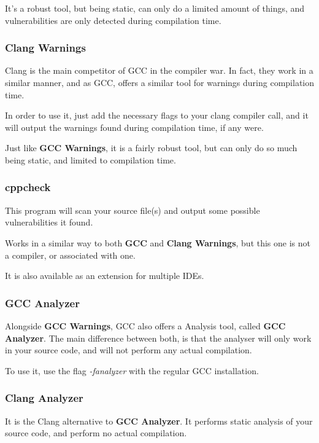 \documentclass{article}
\begin{document}
It's a robust tool, but being static, can only do a limited amount of things, and vulnerabilities are only detected during compilation time.

\subsubsection{Clang Warnings}

Clang is the main competitor of GCC in the compiler war. In fact, they work in a similar manner, and as GCC, offers a similar tool for warnings during compilation time.

In order to use it, just add the necessary flags to your clang compiler call, and it will output the warnings found during compilation time, if any were.

Just like \textbf{GCC Warnings}, it is a fairly robust tool, but can only do so much being static, and limited to compilation time.

\subsubsection{cppcheck}

This program will scan your source file(s) and output some possible vulnerabilities it found.

Works in a similar way to both \textbf{GCC} and \textbf{Clang Warnings}, but this one is not a compiler, or associated with one.

It is also available as an extension for multiple IDEs.

\subsubsection{GCC Analyzer}

Alongside \textbf{GCC Warnings}, GCC also offers a Analysis tool, called \textbf{GCC Analyzer}. The main difference between both, is that the analyser will only work in your source code, and will not perform any actual compilation.

To use it, use the flag \textit{-fanalyzer} with the regular GCC installation.

\subsubsection{Clang Analyzer}

It is the Clang alternative to \textbf{GCC Analyzer}. It performs static analysis of your source code, and perform no actual compilation.
\end{document}
